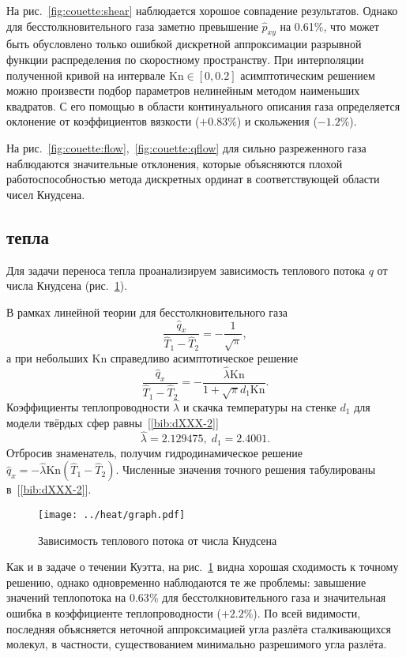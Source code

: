 \documentclass[english,russian,a4paper,12pt]{article}
\newcommand{\Kn}{\mathrm{Kn}}
\begin{document}
На рис.~\ref{fig:couette:shear} наблюдается хорошое совпадение результатов.
Однако для бесстолкновительного газа заметно превышение \(\hat{p}_{xy}\) на 0.61\%,
что может быть обусловлено только ошибкой дискретной аппроксимации разрывной функции распределения по скоростному пространству.
При интерполяции полученной кривой на интервале \(\Kn\in[0,0.2]\) асимптотическим решением 
можно произвести подбор параметров нелинейным методом наименьших квадратов.
С его помощью в области континуального описания газа определяется оклонение 
от коэффициентов вязкости (\(+0.83\%\)) и скольжения (\(-1.2\%\)).

На рис.~\ref{fig:couette:flow},~\ref{fig:couette:qflow} для сильно разреженного газа наблюдаются значительные отклонения,
которые объясняются плохой работоспособностью метода дискретных ординат в соответствующей области чисел Кнудсена.

\subsection*{ тепла}

Для задачи переноса тепла проанализируем зависимость теплового потока \(q\) от числа Кнудсена (рис.~\ref{fig:heat}).

В рамках линейной теории для бесстолкновительного газа
\[ \frac{\hat{q}_x}{\hat{T}_1-\hat{T}_2} = -\frac1{\sqrt{\pi}}, \]
а при небольших \(\Kn\) справедливо асимптотическое решение
\[ \frac{\hat{q}_x}{\hat{T}_1-\hat{T}_2} = -\frac{\hat{\lambda}\Kn}{1+\sqrt{\pi}d_1\Kn}. \]
Коэффициенты теплопроводности \(\hat{\lambda}\) и скачка температуры на стенке \(d_1\) для модели твёрдых сфер равны~[\ref{bib:dXXX-2}]
\[ \hat{\lambda} = 2.129475, \; d_1 = 2.4001. \]
Отбросив знаменатель, получим гидродинамическое решение \(\hat{q}_x = -\hat{\lambda}\Kn(\hat{T}_1-\hat{T}_2)\).
Численные значения точного решения табулированы в~[\ref{bib:dXXX-2}].

\begin{figure}
	\centering
	\texttt{[image: ../heat/graph.pdf]}
	\caption{Зависимость теплового потока от числа Кнудсена}\label{fig:heat}
\end{figure}

Как и в задаче о течении Куэтта, на рис.~\ref{fig:heat} видна хорошая сходимость к точному решению,
однако одновременно наблюдаются те же проблемы: завышение значений теплопотока на \(0.63\)\%
для бесстолкновительного газа и значительная ошибка в коэффициенте теплопроводности (\(+2.2\%\)).
По всей видимости, последняя объясняется неточной аппроксимацией угла разлёта сталкивающихся молекул,
в частности, существованием минимально разрешимого угла разлёта.
\end{document}
